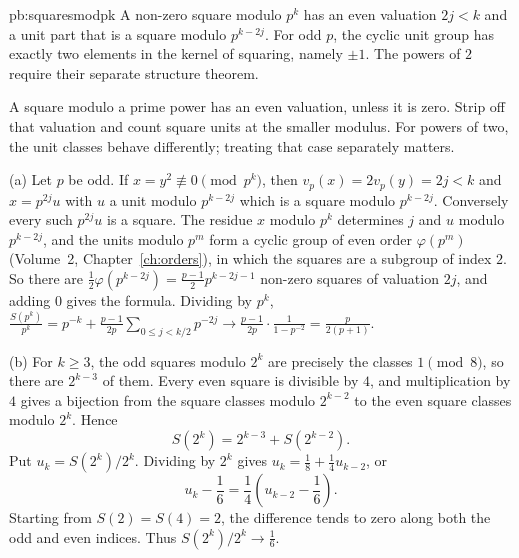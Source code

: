 \begin{solution}{pb:squaresmodpk}
\idea A non-zero square modulo $p^k$ has an even valuation $2j<k$ and a unit part that is a square modulo $p^{k-2j}$. For odd $p$, the cyclic unit group has exactly two elements in the kernel of squaring, namely $\pm1$. The powers of $2$ require their separate structure theorem.

\writeup
A square modulo a prime power has an even valuation, unless it is zero. Strip off that valuation and count square units at the smaller modulus. For powers of two, the unit classes behave differently; treating that case separately matters.

 (a) Let $p$ be odd. If $x=y^2\not\equiv0\pmod{p^k}$, then $v_p(x)=2v_p(y)=2j<k$ and $x=p^{2j}u$ with $u$ a unit modulo $p^{k-2j}$ which is a
square modulo $p^{k-2j}$. Conversely every such $p^{2j}u$ is a square. The residue $x$ modulo $p^k$ determines $j$ and $u$ modulo $p^{k-2j}$,
and the units modulo $p^m$ form a cyclic group of even order $\varphi(p^m)$ (Volume~2, Chapter~\ref{ch:orders}), in which the squares are a subgroup of
index $2$. So there are $\frac12\varphi(p^{k-2j})=\frac{p-1}2p^{k-2j-1}$ non-zero squares of valuation $2j$, and adding $0$ gives the formula.
Dividing by $p^k$, $\frac{S(p^k)}{p^k}=p^{-k}+\frac{p-1}{2p}\sum_{0\le j<k/2}p^{-2j}\to\frac{p-1}{2p}\cdot\frac1{1-p^{-2}}=\frac p{2(p+1)}$.

(b) For $k\ge3$, the odd squares modulo $2^k$ are precisely the classes $1\pmod8$, so there are $2^{k-3}$ of them. Every even square is divisible by $4$, and multiplication by $4$ gives a bijection from the square classes modulo $2^{k-2}$ to the even square classes modulo $2^k$. Hence
\[
S(2^k)=2^{k-3}+S(2^{k-2}).
\]
Put $u_k=S(2^k)/2^k$. Dividing by $2^k$ gives $u_k=\frac18+\frac14u_{k-2}$, or
\[
u_k-\frac16=\frac14\left(u_{k-2}-\frac16\right).
\]
Starting from $S(2)=S(4)=2$, the difference tends to zero along both the odd and even indices. Thus $S(2^k)/2^k\to\frac16$.


\end{solution}
